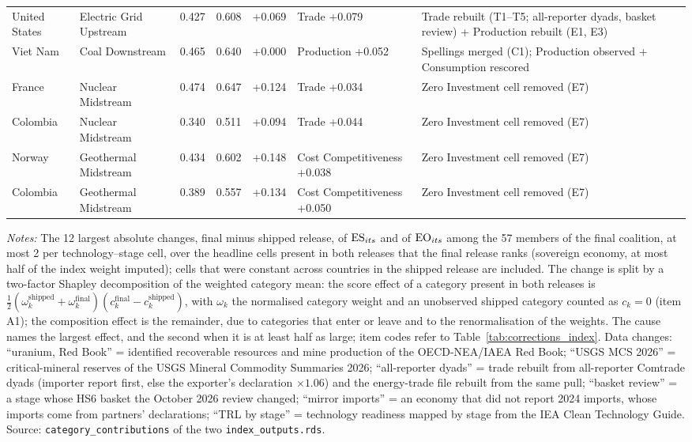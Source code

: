 \begin{longtable}{@{}>{\raggedright\arraybackslash}p{0.75in} >{\raggedright\arraybackslash}p{0.95in} c c c >{\raggedright\arraybackslash}p{1.05in} >{\raggedright\arraybackslash}p{1.9in}@{}}
    United States & Electric Grid Upstream & 0.427 & 0.608 & +0.069 & Trade +0.079 & Trade rebuilt (T1--T5; all-reporter dyads, basket review) + Production rebuilt (E1, E3) \\
    Viet Nam & Coal Downstream & 0.465 & 0.640 & +0.000 & Production +0.052 & Spellings merged (C1); Production observed + Consumption rescored \\
    France & Nuclear Midstream & 0.474 & 0.647 & +0.124 & Trade +0.034 & Zero Investment cell removed (E7) \\
    Colombia & Nuclear Midstream & 0.340 & 0.511 & +0.094 & Trade +0.044 & Zero Investment cell removed (E7) \\
    Norway & Geothermal Midstream & 0.434 & 0.602 & +0.148 & Cost Competitiveness +0.038 & Zero Investment cell removed (E7) \\
    Colombia & Geothermal Midstream & 0.389 & 0.557 & +0.134 & Cost Competitiveness +0.050 & Zero Investment cell removed (E7) \\
  \end{longtable}
  \vspace{-6pt}\footnotesize\noindent
    \emph{Notes:} The 12 largest absolute changes, final minus shipped release, of $\mathrm{ES}_{its}$ and of $\mathrm{EO}_{its}$ among the 57 members of the final coalition, at most 2 per technology--stage cell, over the headline cells present in both releases that the final release ranks (sovereign economy, at most half of the index weight imputed); cells that were constant across countries in the shipped release are included. The change is split by a two-factor Shapley decomposition of the weighted category mean: the score effect of a category present in both releases is $\tfrac12(\omega^{\text{shipped}}_k+\omega^{\text{final}}_k)(c^{\text{final}}_k-c^{\text{shipped}}_k)$, with $\omega_k$ the normalised category weight and an unobserved shipped category counted as $c_k=0$ (item A1); the composition effect is the remainder, due to categories that enter or leave and to the renormalisation of the weights. The cause names the largest effect, and the second when it is at least half as large; item codes refer to Table~\ref{tab:corrections_index}. Data changes: ``uranium, Red Book'' = identified recoverable resources and mine production of the OECD-NEA/IAEA Red Book; ``USGS MCS 2026'' = critical-mineral reserves of the USGS Mineral Commodity Summaries 2026; ``all-reporter dyads'' = trade rebuilt from all-reporter Comtrade dyads (importer report first, else the exporter's declaration $\times 1.06$) and the energy-trade file rebuilt from the same pull; ``basket review'' = a stage whose HS6 basket the October 2026 review changed; ``mirror imports'' = an economy that did not report 2024 imports, whose imports come from partners' declarations; ``TRL by stage'' = technology readiness mapped by stage from the IEA Clean Technology Guide. Source: \texttt{category\_contributions} of the two \texttt{index\_outputs.rds}.\par
\endgroup
\medskip
